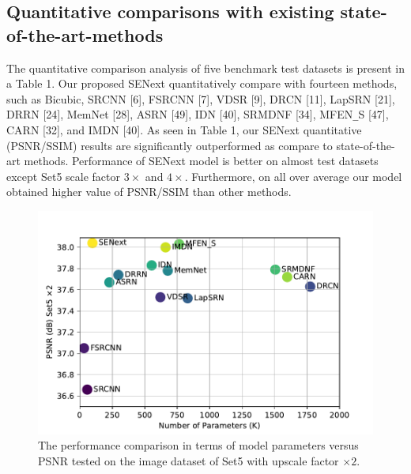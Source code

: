 \documentclass{ieeeaccess}
\begin{document}
\subsection{Quantitative comparisons with existing state-of-the-art-methods}
The quantitative comparison analysis of five benchmark test datasets is present in a Table 1. Our proposed SENext quantitatively compare with fourteen methods, such as Bicubic, SRCNN [6], FSRCNN [7], VDSR [9], DRCN [11], LapSRN [21], DRRN [24], MemNet [28], ASRN [49], IDN [40], SRMDNF [34], MFEN\texttt{\_}S [47], CARN [32], and IMDN [40]. 
As seen in Table 1, our SENext quantitative (PSNR/SSIM) results are significantly outperformed as compare to state-of-the-art methods. Performance of SENext model is better on almost test datasets except Set5 scale factor $3\times$ and $4\times$. Furthermore, on all over average our model obtained higher value of PSNR/SSIM than other methods.

\begin{figure}[ht]
  \includegraphics[width=\linewidth]{9FIGURE.pdf}
  \caption{The performance comparison in terms of model parameters versus PSNR tested on the image dataset of Set5 with upscale factor $\times2$.}
  \label{fig:10}
\end{figure}
\end{document}
